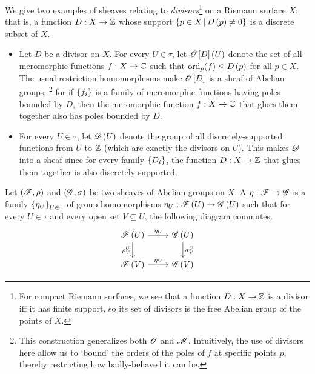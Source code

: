 \documentclass[../Moduli_Spaces_of_Riemann_Surfaces.tex]{subfiles}
\begin{document}
    \begin{example}
        We give two examples of sheaves relating to \textit{divisors}\footnote{For compact Riemann surfaces, we see that a function $D:X\to\mathbb{Z}$ is a divisor iff it has finite support, so its set of divisors is the free Abelian group of the points of $X$.} on a Riemann surface $X$; that is, a function $D:X\to\mathbb{Z}$ whose support $\left\{p\in X\,\middle\vert\, D\left(p\right)\neq0\right\}$ is a discrete subset of $X$.
        \begin{itemize}
            \item Let $D$ be a divisor on $X$. For every $U\in\tau$, let $\mathscr{O}\left[D\right]\left(U\right)$ denote the set of all meromorphic functions $f:X\to\mathbb{C}$ such that $\operatorname{ord}_p\!\left(f\right)\leq D\left(p\right)$ for all $p\in X$. The usual restriction homomorphisms make $\mathscr{O}\left[D\right]$ is a sheaf of Abelian groups, \footnote{This construction generalizes both $\mathscr{O}$ and $\mathscr{M}$. Intuitively, the use of divisors here allow us to `bound' the orders of the poles of $f$ at specific points $p$, thereby restricting how badly-behaved it can be.} for if $\left\{f_i\right\}$ is a family of meromorphic functions having poles bounded by $D$, then the meromorphic function $f:X\to\mathbb{C}$ that glues them together also has poles bounded by $D$.
            \item For every $U\in\tau$, let $\mathscr{D}\left(U\right)$ denote the group of all discretely-supported functions from $U$ to $\mathbb{Z}$ (which are exactly the divisors on $U$). This makes $\mathscr{D}$ into a sheaf since for every family $\left\{D_i\right\}$, the function $D:X\to\mathbb{Z}$ that glues them together is also discretely-supported.\exqed
        \end{itemize}
    \end{example}
    \begin{definition}
        Let $\left(\mathscr{F},\rho\right)$ and $\left(\mathscr{G},\sigma\right)$ be two sheaves of Abelian groups on $X$. A   $\eta:\mathscr{F}\to\mathscr{G}$ is a family $\left\{\eta_U\right\}_{U\in\tau}$ of group homomorphisms $\eta_U:\mathscr{F}\left(U\right)\to\mathscr{G}\left(U\right)$ such that for every $U\in\tau$ and every open set $V\subseteq U$, the following diagram commutes.
        \begin{equation*}
            \begin{tikzcd}
                \ms{F}\l(U\r) \ar[r, "\eta_U"] \ar[d, "\rho^U_V"'] & \ms{G}\l(U\r) \ar[d, "\sigma^U_V"] \\
                \ms{F}\l(V\r) \ar[r, "\eta_V"] & \ms{G}\l(V\r)
            \end{tikzcd}
        \end{equation*}
    \end{definition}
\end{document}
